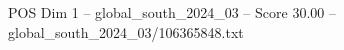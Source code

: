 \begin{textsample}{POS Dim 1 – global\_south\_2024\_03 – Score 30.00 – global\_south\_2024\_03/106365848.txt}
\end{textsample}
